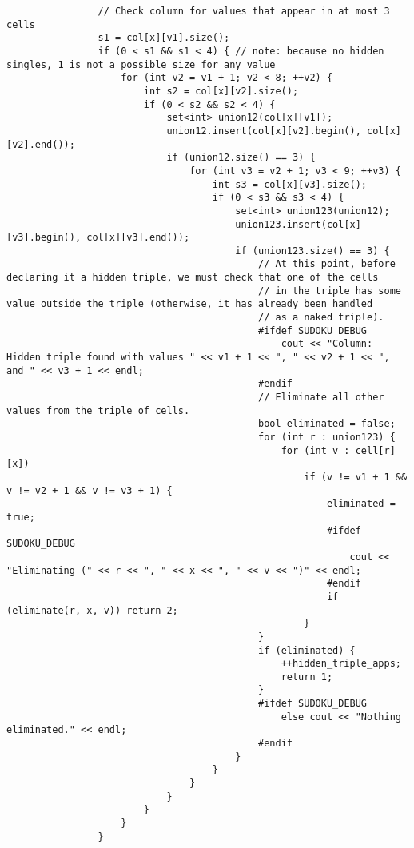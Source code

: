 \documentclass{article}
\begin{document}
\begin{lstlisting}
                // Check column for values that appear in at most 3 cells
                s1 = col[x][v1].size();
                if (0 < s1 && s1 < 4) { // note: because no hidden singles, 1 is not a possible size for any value
                    for (int v2 = v1 + 1; v2 < 8; ++v2) {
                        int s2 = col[x][v2].size();
                        if (0 < s2 && s2 < 4) {
                            set<int> union12(col[x][v1]);
                            union12.insert(col[x][v2].begin(), col[x][v2].end());
                            if (union12.size() == 3) {
                                for (int v3 = v2 + 1; v3 < 9; ++v3) {
                                    int s3 = col[x][v3].size();
                                    if (0 < s3 && s3 < 4) {
                                        set<int> union123(union12);
                                        union123.insert(col[x][v3].begin(), col[x][v3].end());
                                        if (union123.size() == 3) {
                                            // At this point, before declaring it a hidden triple, we must check that one of the cells
                                            // in the triple has some value outside the triple (otherwise, it has already been handled
                                            // as a naked triple).
                                            #ifdef SUDOKU_DEBUG
                                                cout << "Column: Hidden triple found with values " << v1 + 1 << ", " << v2 + 1 << ", and " << v3 + 1 << endl;
                                            #endif
                                            // Eliminate all other values from the triple of cells.
                                            bool eliminated = false;
                                            for (int r : union123) {
                                                for (int v : cell[r][x])
                                                    if (v != v1 + 1 && v != v2 + 1 && v != v3 + 1) {
                                                        eliminated = true;
                                                        #ifdef SUDOKU_DEBUG
                                                            cout << "Eliminating (" << r << ", " << x << ", " << v << ")" << endl;
                                                        #endif
                                                        if (eliminate(r, x, v)) return 2;
                                                    }
                                            }
                                            if (eliminated) {
                                                ++hidden_triple_apps;
                                                return 1;
                                            }
                                            #ifdef SUDOKU_DEBUG
                                                else cout << "Nothing eliminated." << endl;
                                            #endif
                                        }
                                    }
                                }
                            }
                        }
                    }
                }


\end{lstlisting}
\end{document}

